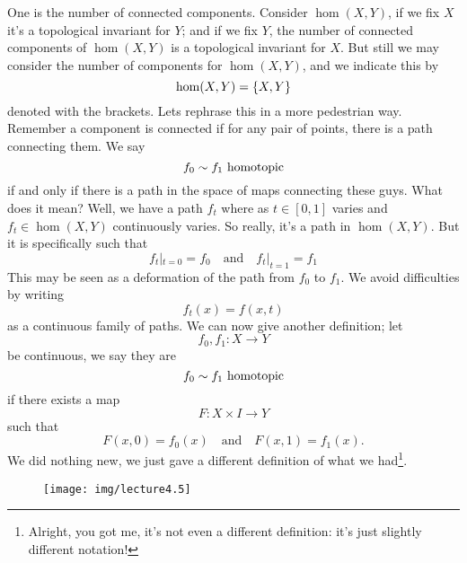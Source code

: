 One is the number of connected components. Consider $\hom(X,Y)$,
if we fix $X$ it's a topological invariant for $Y$; and if we fix
$Y$, the number of connected components of $\hom(X,Y)$ is a
topological invariant for $X$. 
But still we may consider the number of components for
$\hom(X,Y)$, and we indicate this by
\begin{equation}
\hom(X,Y)=\homotopyClass(X,Y)
\end{equation}
denoted with the brackets. Lets rephrase this in a more
pedestrian way. Remember a component is connected if for any pair
of points, there is a path connecting them. We
say
\begin{equation}
f_{0}\sim f_{1}\mbox{ homotopic}
\end{equation}
if and only if there is a path in the space of maps connecting
these guys. What does it mean? Well, we have a path $f_{t}$ where
as $t\in[0,1]$ varies and $f_{t}\in\hom(X,Y)$ continuously
varies. So really, it's a path in $\hom(X,Y)$. But it is
specifically such that
\begin{equation}
f_{t}|_{t=0}=f_{0}\quad\mbox{and}\quad
f_{t}|_{t=1}=f_{1}
\end{equation}
This may be seen as a deformation of the path from $f_0$ to
$f_1$. We avoid difficulties by writing
\begin{equation}
f_{t}(x)=f(x,t)
\end{equation}
as a continuous family of paths. We can now give another
definition; let
\begin{equation}
f_{0},f_{1}\colon X\to Y
\end{equation}
be continuous, we say they are
\begin{equation}
f_{0}\sim f_{1}\mbox{ homotopic}
\end{equation}
if there exists a map
\begin{equation}
F\colon X\times I\to Y
\end{equation}
such that
\begin{equation}
F(x,0)=f_{0}(x)\quad\mbox{and}\quad F(x,1)=f_{1}(x).
\end{equation}
We did nothing new, we just gave a different definition of what
we had\footnote{Alright, you got me, it's not even a different
  definition: it's just slightly different notation!}.

\begin{wrapfigure}{r}{1in}
  \vspace{-20pt}
  \centering
  \texttt{[image: img/lecture4.5]}
\end{wrapfigure}

